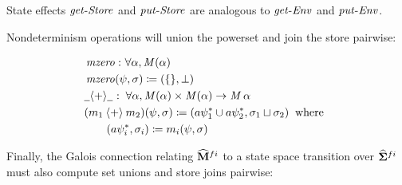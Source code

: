 State effects $ \operatorname{\mathit{get-Store}} $ and $ \operatorname{\mathit{put-Store}} $ are
analogous to $ \operatorname{\mathit{get-Env}} $ and $ \operatorname{\mathit{put-Env}} $.

\par

Nondeterminism operations will union the powerset and join the store
pairwise:

\small\begin{align*}
&\hspace{0em}  \operatorname{\mathit{mzero}}   \mathbin{\colon}   \forall   \alpha ,  \operatorname{\mathit{M}}(  \alpha ) \\
&\hspace{0em}  \operatorname{\mathit{mzero}}(  \psi , \sigma )  \coloneqq  ( \{  \} ,  \bot ) \\
&\hspace{0em}  \underline{\hspace{0.5em}}{  \mathbin{\langle + \rangle}  }\underline{\hspace{0.5em}}   \mathbin{\colon}   \forall   \alpha ,  \operatorname{\mathit{M}}(  \alpha )  \times   \operatorname{\mathit{M}}(  \alpha )  \rightarrow   \operatorname{\mathit{M}}   \alpha   \\
&\hspace{0em} (m _1   \mathbin{\langle + \rangle}  m _2 )( \psi , \sigma )  \coloneqq  (a \psi  ^{ * }  _1   \cup  a \psi  ^{ * }  _2 , \sigma  _1   \sqcup   \sigma  _2 )  \;\;\text{where}\;\;   \\
&\hspace{2em} (a \psi  ^{ * }  _i , \sigma  _i )  \coloneqq  m _i ( \psi , \sigma )
\end{align*}\normalsize

\par

Finally, the Galois connection relating $ \widehat{\mathtt{\mathbf{M}}} ^{  fi } $ to
a state space transition over $ \widehat{\mathtt{\mathbf{\Sigma}}}  ^{ fi } $ must also
compute set unions and store joins pairwise:

